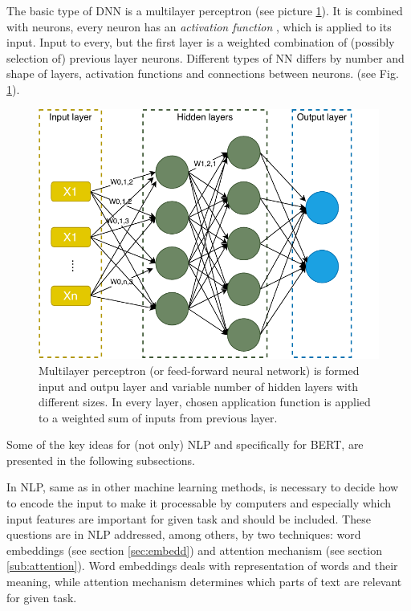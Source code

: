 \par
The basic type of DNN is a multilayer perceptron (see picture \ref{pic:multilayer}).
It is combined with neurons, every neuron has an \textit{activation function} %
, which is applied to its input. Input to every, but the first layer is a weighted combination of (possibly selection of) previous layer neurons. 
Different types of NN differs by number and shape of layers, activation functions and connections between neurons. (see Fig. \ref{pic:multilayer}).
\begin{figure}[h]
\centering
\includegraphics[width=1\columnwidth]{../img/multilayer}
\caption{Multilayer perceptron (or feed-forward neural network) is formed input and outpu layer and variable number of hidden layers with different sizes. In every layer, chosen application function is applied to a weighted sum of inputs from previous layer.}
\label{pic:multilayer}
\end{figure}

\par
Some of the key ideas for (not only) NLP and specifically for BERT, are presented in the following subsections.

\par
In NLP, same as in other machine learning methods, is necessary to decide how to encode the input to make it processable by computers and especially which input features are important for given task and should be included. These questions are in NLP addressed, among others, by two techniques: word embeddings (see section \ref{sec:embedd}) and attention mechanism (see section \ref{sub:attention}). Word embeddings deals with representation of words and their meaning, while attention mechanism determines which parts of text are relevant for given task.

